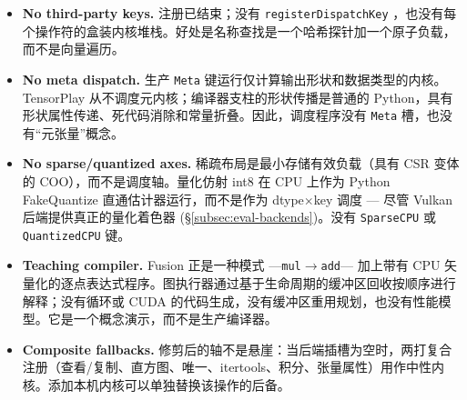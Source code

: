 \begin{itemize}[leftmargin=1.2em]
\item \textbf{No third-party keys.} 注册已结束；没有 \texttt{registerDispatchKey} ，也没有每个操作符的盒装内核堆栈。好处是名称查找是一个哈希探针加一个原子负载，而不是向量遍历。
\item \textbf{No meta dispatch.} 生产 \texttt{Meta} 键运行仅计算输出形状和数据类型的内核。 TensorPlay 从不调度元内核；编译器支柱的形状传播是普通的 Python，具有形状属性传递、死代码消除和常量折叠。因此，调度程序没有 \texttt{Meta} 槽，也没有“元张量”概念。
\item \textbf{No sparse/quantized axes.} 稀疏布局是最小存储有效负载（具有 CSR 变体的 COO），而不是调度轴。量化仿射 int8 在 CPU 上作为 Python FakeQuantize 直通估计器运行，而不是作为 dtype$\times$key 调度 — 尽管 Vulkan 后端提供真正的量化着色器 (\S\ref{subsec:eval-backends})。没有 \texttt{SparseCPU} 或 \texttt{QuantizedCPU} 键。
\item \textbf{Teaching compiler.} Fusion 正是一种模式 ---\texttt{mul}$\rightarrow$\texttt{add}--- 加上带有 CPU 矢量化的逐点表达式程序。图执行器通过基于生命周期的缓冲区回收按顺序进行解释；没有循环或 CUDA 的代码生成，没有缓冲区重用规划，也没有性能模型。它是一个概念演示，而不是生产编译器。
\item \textbf{Composite fallbacks.} 修剪后的轴不是悬崖：当后端插槽为空时，两打复合注册（查看/复制、直方图、唯一、itertools、积分、张量属性）用作中性内核。添加本机内核可以单独替换该操作的后备。
\end{itemize}